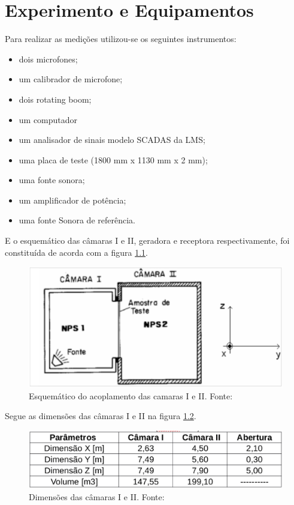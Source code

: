 \chapter{Experimento e Equipamentos}\label{descricao}

Para realizar as medições utilizou-se os seguintes instrumentos:

\begin{itemize}
	\item dois microfones;
	\item um calibrador de microfone;
	\item dois rotating boom;
	\item um computador
	\item um analisador de sinais modelo SCADAS da LMS;
	\item uma placa de teste (1800 mm x 1130 mm x 2 mm);
	\item uma fonte sonora;
	\item um amplificador de potência;
	\item uma fonte Sonora de referência.
\end{itemize}

E o esquemático das câmaras I e II, geradora e receptora respectivamente, foi constituída de acorda com a figura \ref{experimento_1}.

\begin{figure}[h]
	\centering
	\includegraphics[scale=0.28]{imagem_3.eps}
	\caption{Esquemático do acoplamento das camaras I e II. Fonte: \cite{silva2009simulaccao}}
	\label{experimento_1}
\end{figure}

\newpage
Segue as dimensões das câmaras I e II na figura \ref{experimento_2}.

\begin{figure}[h]
	\centering
	\includegraphics[scale=0.35]{imagem_4.eps}
	\caption{Dimensões das câmaras I e II. Fonte: \cite{silva2009simulaccao}}
	\label{experimento_2}
\end{figure}

